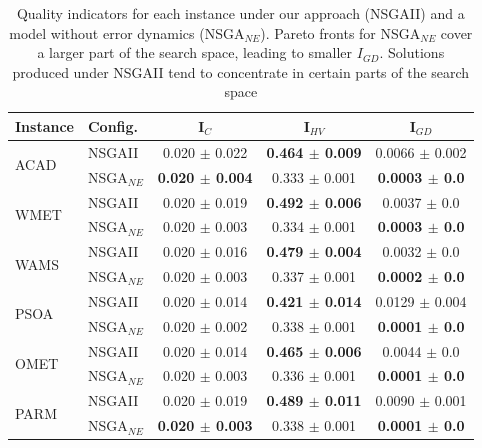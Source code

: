 \documentclass[conference]{IEEEtran}
\begin{document}
\begin{table}[htbp]
	\scriptsize
  \centering
  \caption{Quality indicators for each instance under our approach (NSGAII) and a model without error dynamics (NSGA$_{NE}$). Pareto fronts for NSGA$_{NE}$ cover a larger part of the search space, leading to smaller $I_{GD}$. Solutions produced under NSGAII tend to concentrate in certain parts of the search space}
    \begin{tabular}{p{0.8cm}p{1.0cm}ccc}
    \toprule
    \textbf{Instance} & \textbf{Config.} & \textbf{I$_{C}$} & \textbf{I$_{HV}$} & \textbf{I$_{GD}$} \\
    \midrule
    \multirow{2}[2]{*}{ACAD} & NSGAII & 0.020 $\pm$ 0.022 & \textbf{0.464 $\pm$ 0.009} & 0.0066 $\pm$ 0.002 \\
          & NSGA$_{NE}$ & \textbf{0.020 $\pm$ 0.004} & 0.333 $\pm$ 0.001 & \textbf{0.0003 $\pm$ 0.0} \\\hline
    \multirow{2}[2]{*}{WMET} & NSGAII & 0.020 $\pm$ 0.019 & \textbf{0.492 $\pm$ 0.006} & 0.0037 $\pm$ 0.0 \\
          & NSGA$_{NE}$ & 0.020 $\pm$ 0.003 & 0.334 $\pm$ 0.001 & \textbf{0.0003 $\pm$ 0.0} \\\hline
    \multirow{2}[2]{*}{WAMS} & NSGAII & 0.020 $\pm$ 0.016 & \textbf{0.479 $\pm$ 0.004} & 0.0032 $\pm$ 0.0 \\
          & NSGA$_{NE}$ & 0.020 $\pm$ 0.003 & 0.337 $\pm$ 0.001 & \textbf{0.0002 $\pm$ 0.0} \\\hline
    \multirow{2}[2]{*}{PSOA} & NSGAII & 0.020 $\pm$ 0.014 & \textbf{0.421 $\pm$ 0.014} & 0.0129 $\pm$ 0.004 \\
          & NSGA$_{NE}$ & 0.020 $\pm$ 0.002 & 0.338 $\pm$ 0.001 & \textbf{0.0001 $\pm$ 0.0} \\\hline
    \multirow{2}[2]{*}{OMET} & NSGAII & 0.020 $\pm$ 0.014 & \textbf{0.465 $\pm$ 0.006} & 0.0044 $\pm$ 0.0 \\
          & NSGA$_{NE}$ & 0.020 $\pm$ 0.003 & 0.336 $\pm$ 0.001 & \textbf{0.0001 $\pm$ 0.0} \\\hline
    \multirow{2}[2]{*}{PARM} & NSGAII & 0.020 $\pm$ 0.019 & \textbf{0.489 $\pm$ 0.011} & 0.0090 $\pm$ 0.001 \\
          & NSGA$_{NE}$ & \textbf{0.020 $\pm$ 0.003} & 0.338 $\pm$ 0.001 & \textbf{0.0001 $\pm$ 0.0} \\
    \bottomrule
    \end{tabular}%
\end{table}%
\end{document}

